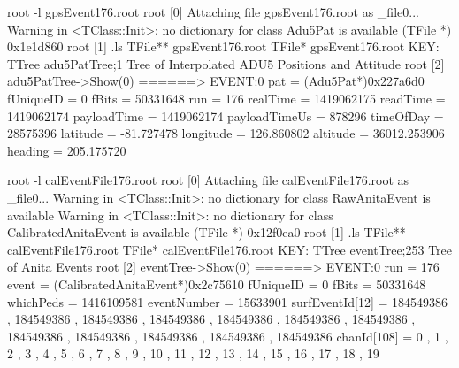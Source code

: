 \par
\begin{verbbox}
root -l gpsEvent176.root 
root [0] 
Attaching file gpsEvent176.root as _file0...
Warning in <TClass::Init>: 
no dictionary for class Adu5Pat is available
(TFile *) 0x1e1d860
root [1] .ls
TFile**		gpsEvent176.root	
 TFile*		gpsEvent176.root	
  KEY: TTree	adu5PatTree;1	
Tree of Interpolated ADU5 Positions and Attitude
root [2] adu5PatTree->Show(0)
======> EVENT:0
 pat             = (Adu5Pat*)0x227a6d0
 fUniqueID       = 0
 fBits           = 50331648
 run             = 176
 realTime        = 1419062175
 readTime        = 1419062174
 payloadTime     = 1419062174
 payloadTimeUs   = 878296
 timeOfDay       = 28575396
 latitude        = -81.727478
 longitude       = 126.860802
 altitude        = 36012.253906
 heading         = 205.175720
 \end{verbbox}
\fbox{\theverbbox}
\par


\begin{verbbox}
root -l calEventFile176.root 
root [0] 
Attaching file calEventFile176.root as _file0...
Warning in <TClass::Init>: 
no dictionary for class RawAnitaEvent is available
Warning in <TClass::Init>: 
no dictionary for class CalibratedAnitaEvent is available
(TFile *) 0x12f0ea0
root [1] .ls
TFile**		calEventFile176.root	
 TFile*		calEventFile176.root	
  KEY: TTree	eventTree;253	
Tree of Anita Events
root [2] eventTree->Show(0)
======> EVENT:0
 run             = 176
 event           = (CalibratedAnitaEvent*)0x2c75610
 fUniqueID       = 0
 fBits           = 50331648
 whichPeds       = 1416109581
 eventNumber     = 15633901
 surfEventId[12] = 184549386 , 184549386 , 184549386 , 
 184549386 , 184549386 , 
                    184549386 , 184549386 , 184549386 , 
                    184549386 , 184549386 , 
                    184549386 , 184549386 
 chanId[108]     = 0 , 1 , 2 , 3 , 4 , 5 , 6 , 7 , 8 , 
 9 , 10 , 11 , 12 , 13 , 14 , 15 , 16 , 17 , 18 , 19
\end{verbbox}
\fbox{\theverbbox}                 
